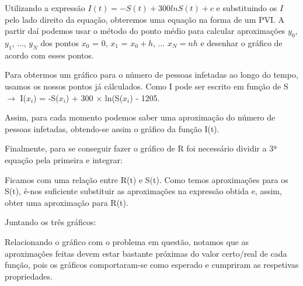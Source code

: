 \documentclass[portuguese, a4paper]{article}
\begin{document}
		Utilizando a expressão $I(t) = -S(t) + 300 ln S(t) + c$ e substituindo
		os $I$ pelo lado direito da equação, obteremos uma equação na forma de um 
		PVI. A partir daí podemos usar o método do ponto médio para calcular aproximações $y_0$, $y_1$, ..., $y_N$ dos pontos
		$x_0$ = 0, $x_1$ = $x_0 + h$, ... $x_N= nh$ e desenhar o gráfico de acordo com esses pontos.
		
		Para obtermos um gráfico para o número de pessoas infetadas ao longo do tempo, usamos os nossos
		pontos já cálculados.
		Como I pode ser escrito em função de S $\rightarrow$
		I($x_i$) = -S($x_i$) + 300 $\times$ ln(S($x_i$) - 1205.
		
		Assim, para cada momento podemos saber uma aproximação do número de pessoas infetadas, obtendo-se assim
		o gráfico da função I(t).
		
		Finalmente, para se conseguir fazer o gráfico de R foi necessário dividir a 3ª equação pela primeira e integrar:
		
		Ficamos com uma relação entre R(t) e S(t). Como temos aproximações para os S(t), 
		é-nos suficiente substituir as aproximações na expressão obtida e, assim, obter uma aproximação para R(t).
		
		Juntando os três gráficos:
		
		
		Relacionando o gráfico com o problema em questão, notamos que as aproximações feitas devem estar
		bastante próximas do valor certo/real de cada função, pois os gráficos comportaram-se como esperado e cumpriram as respetivas propriedades.
		
\end{document}
